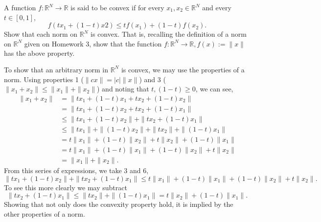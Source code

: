 \documentclass[12pt,letterpaper]{exam}
\begin{document}
\begin{questions}
\question
A function \(f:\mathbb{R}^N \rightarrow \mathbb{R}\) is said to be convex if for every 
\(x_1,x_2 \in\mathbb{R}^N\) and every \(t \in [0,1]\),
\[f(tx_1 + (1-t)x2) \leq t f(x_1)+ (1-t)f(x_2).\]
Show that each norm on \(\mathbb{R}^N\) is convex. 
That is, recalling the definition of a norm on \(\mathbb{R}^N\) given on Homework 3, show that 
the function \(f:\mathbb{R}^N \rightarrow \mathbb{R}, f(x) := \|x\|\) has the above property.
\begin{solution}
    To show that an arbitrary norm in \(\mathbb{R}^N\) is convex,
    we may use the properties of a norm.
    Using properties 1 (\(\|cx\| = |c|\|x\| \)) and 3 (\(\|x_1 + x_2\| \leq \|x_1\| + \|x_2\|\))
    and noting that \(t,(1-t)\geq0\),
    we can see,
    \begin{align}
        \|x_1 + x_2\|
        &= \|tx_1 + (1-t)x_1 + tx_2 + (1-t)x_2\| \\
        &= \|tx_1 + (1-t)x_2 + tx_2 + (1-t)x_1\| \\ 
        &\leq \|tx_1 + (1-t)x_2\| + \|tx_2 + (1-t)x_1\| \\
        &\leq \|tx_1\| + \|(1-t)x_2\| + \|tx_2\| + \|(1-t)x_1\| \\
        &= t\|x_1\| + (1-t)\|x_2\| + t\|x_2\| + (1-t)\|x_1\| \\
        &= t\|x_1\| + (1-t)\|x_1\| + (1-t)\|x_2\| + t\|x_2\| \\
        &= \|x_1\| + \|x_2\|.
    \end{align}
    From this series of expressions, we take 3 and 6,
    \[\|tx_1 + (1-t)x_2\| + \|tx_2 + (1-t)x_1\| 
        \leq t\|x_1\| + (1-t)\|x_1\| + (1-t)\|x_2\| + t\|x_2\|.\]
    To see this more clearly we may subtract
    \[ \|tx_2 + (1-t)x_1\| \leq \|tx_2\| + \|(1-t)x_1\| = t\|x_2\| + (1-t)\|x_1\|.\]
    Showing that not only does the convexity property hold,
    it is implied by the other properties of a norm.
\end{solution}
\clearpage


\end{questions}
\end{document}
